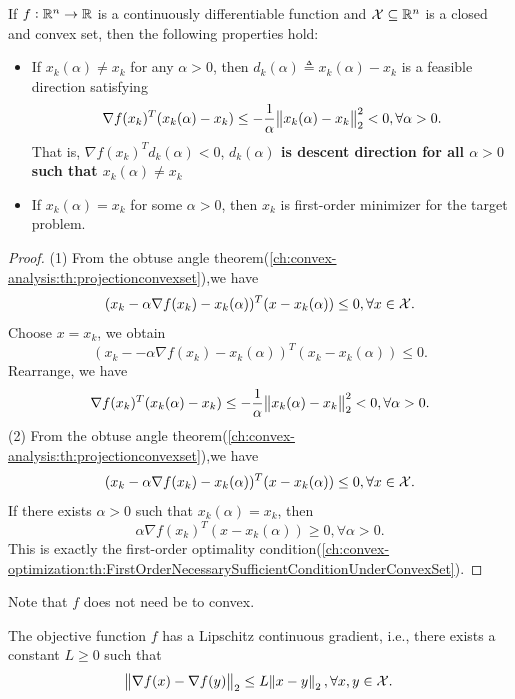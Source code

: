 \begin{refsection}
\begin{lemma}\cite[304]{bertsekas2015convex}\label{ch:convex-optimization:th:descentPropertyGradientProjectionArc}
If $f:\mathbb{R}^n\to \mathbb{R}$ is a continuously differentiable function and $\mathcal{X} \subseteq \mathbb{R}^n$ is a closed and convex set, then the following properties hold:
\begin{itemize}
	\item If $x_k(\alpha) \neq x_k$ for any $\alpha > 0$, then $d_k(\alpha) \triangleq x_k(\alpha) - x_k$ is a feasible direction satisfying
	$$\nabla f(x_k)^T(x_k(\alpha) - x_k) \leq -\frac{1}{\alpha} \norm{x_k(\alpha) - x_k}_2^2 < 0, \forall \alpha > 0.$$
	That is, $\nabla f(x_k)^T d_k(\alpha) < 0$, \textbf{$d_k(\alpha)$ is descent direction for all $\alpha > 0$ such that $x_k(\alpha)\neq x_k$}
	\item If $x_k(\alpha) = x_k$ for some $\alpha > 0$, then $x_k$ is first-order minimizer for the target problem.
\end{itemize}
\end{lemma}
\begin{proof}
(1)
From the obtuse angle theorem(\autoref{ch:convex-analysis:th:projectionconvexset}),we have
$$(x_k - \alpha \nabla f(x_k) - x_k(\alpha))^T(x - x_k(\alpha)) \leq 0, \forall x\in \mathcal{X}.$$
Choose $x = x_k$, we obtain
$$(x_k - - \alpha \nabla f(x_k) - x_k(\alpha))^T(x_k - x_k(\alpha)) \leq 0.$$
Rearrange, we have
$$\nabla f(x_k)^T(x_k(\alpha) - x_k) \leq -\frac{1}{\alpha} \norm{x_k(\alpha) - x_k}_2^2 < 0, \forall \alpha > 0.$$
(2)
From the obtuse angle theorem(\autoref{ch:convex-analysis:th:projectionconvexset}),we have
$$(x_k - \alpha \nabla f(x_k) - x_k(\alpha))^T(x - x_k(\alpha)) \leq 0, \forall x\in \mathcal{X}.$$
If there exists $\alpha > 0$ such that $x_k(\alpha) = x_k$, then
$$\alpha \nabla f(x_k)^T(x - x_k(\alpha)) \geq 0, \forall \alpha > 0.$$
This is exactly the first-order optimality condition(\autoref{ch:convex-optimization:th:FirstOrderNecessarySufficientConditionUnderConvexSet}). 
\end{proof}

\begin{remark}
	Note that $f$ does not need be to convex. 
	
\end{remark}




\begin{definition}
The objective function $f$ has a Lipschitz continuous gradient, i.e., there exists a constant $L\geq 0$ such that 
$$\norm{\nabla f(x) - \nabla f(y)}_2 \leq L\norm{x-y}_2, \forall x,y \in \mathcal{X} .$$ 
\end{definition}



\end{refsection}
